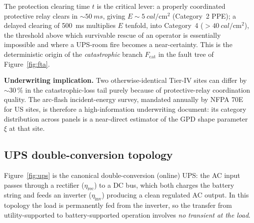 The protection clearing time $t$ is the critical lever: a properly
coordinated protective relay clears in $\sim\SI{50}{ms}$, giving
$E\sim\SI{5}{cal\per\cm\squared}$ (Category~2 PPE); a delayed clearing
of \SI{500}{ms} multiplies $E$ tenfold, into Category~4 ($>\SI{40}{cal
\per\cm\squared}$), the threshold above which survivable rescue of an
operator is essentially impossible and where a UPS-room fire becomes
a near-certainty. This is the deterministic origin of the
\emph{catastrophic} branch $F_{\mathrm{cat}}$ in the fault tree of
Figure~\ref{fig:fta}.

\begin{nbox}
\textbf{Underwriting implication.} Two otherwise-identical Tier-IV
sites can differ by $\sim 30\,\%$ in the catastrophic-loss tail
purely because of protective-relay coordination quality. The
arc-flash incident-energy survey, mandated annually by NFPA 70E for
US sites, is therefore a high-information underwriting document:
its category distribution across panels is a near-direct
estimator of the GPD shape parameter $\xi$ at that site.
\end{nbox}

\subsection{UPS double-conversion topology}\label{ss:ups}

Figure~\ref{fig:ups} is the canonical double-conversion (online) UPS:
the AC input passes through a rectifier ($\eta_{\mathrm{rec}}$) to a DC
bus, which both charges the battery string and feeds an inverter
($\eta_{\mathrm{inv}}$) producing a clean regulated AC output. In
this topology the load is permanently fed from the inverter, so the
transfer from utility-supported to battery-supported operation
involves \emph{no transient at the load}.

